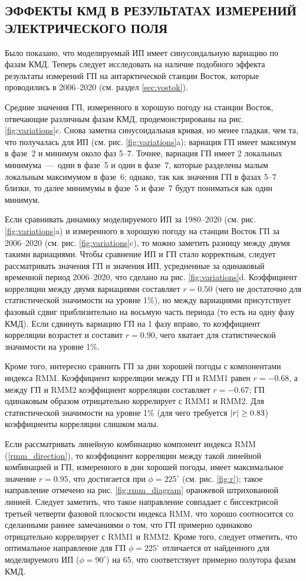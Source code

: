 \subsection{ЭФФЕКТЫ КМД В РЕЗУЛЬТАТАХ ИЗМЕРЕНИЙ ЭЛЕКТРИЧЕСКОГО ПОЛЯ}
\label{sec:mjo_pg}

Было показано, что моделируемый ИП имеет синусоидальную вариацию по фазам КМД. Теперь следует исследовать на наличие подобного эффекта результаты измерений ГП на антарктической станции Восток, которые проводились в 2006--2020 (см. раздел \ref{sec:vostok}).

Средние значения ГП, измеренного в хорошую погоду на станции Восток, отвечающие различным фазам КМД, продемонстрированы на рис. \ref{fig:variations}{c}. Снова заметна синусоидальная кривая, но менее гладкая, чем та, что получалась для ИП (см. рис. \ref{fig:variations}{a}); вариация ГП имеет максимум в фазе~2 и минимум около фаз 5--7. Точнее, вариация ГП имеет 2 локальных минимума~---~один в фазе~5 и один в фазе~7, которые разделены малым локальным максимумом в фазе~6; однако, так как значения ГП в фазах 5--7 близки, то далее минимумы в фазе~5 и фазе~7 будут пониматься как один минимум.

Если сравнивать динамику моделируемого ИП за 1980--2020 (см. рис. \ref{fig:variations}{a}) и измеренного в хорошую погоду на станции Восток ГП за 2006--2020 (см. рис. \ref{fig:variations}{c}), то можно заметить разницу между двумя такими вариациями. Чтобы сравнение ИП и ГП стало корректным, следует рассматривать значения ГП и значения ИП, усредненные за одинаковый временной период 2006--2020, что сделано на рис. \ref{fig:variations}{d}. Коэффициент корреляции между двумя вариациями составляет $r=0.50$ (чего не достаточно для статистической значимости на уровне 1\%), но между вариациями присутствует фазовый сдвиг приблизительно на восьмую часть периода (то есть на одну фазу КМД). Если сдвинуть вариацию ГП на 1 фазу вправо, то коэффициент корреляции возрастет и составит $r=0.90$, чего хватает для статистической значимости на уровне 1\%.

Кроме того, интересно сравнить ГП за дни хорошей погоды с компонентами индекса RMM. Коэффициент корреляции между ГП и RMM1 равен $r=-0.68$, а между ГП и RMM2 коэффициент корреляции составляет $r=-0.67$; ГП одинаковым образом отрицательно коррелирует с RMM1 и RMM2. Для статистической значимости на уровне 1\% (для чего требуется $\abs{r}\ge0.83$) коэффициенты корреляции слишком малы.

Если рассматривать линейную комбинацию компонент индекса RMM (\ref{rmm_direction}), то коэффициент корреляции между такой линейной комбинацией и ГП, измеренного в дни хорошей погоды, имеет максимальное значение $r=0.95$, что достигается при $\phi=225^\circ$ (см. рис. \ref{fig:r}); такое направление отмечено на рис. \ref{fig:rmm_diagram} оранжевой штрихованной линией. Следует заметить, что такое направление совпадает с биссектрисой третьей четверти фазовой плоскости индекса RMM, что хорошо соотносится со сделанными раннее замечаниями о том, что ГП примерно одинаково отрицательно коррелирует с RMM1 и RMM2. Кроме того, следует отметить, что оптимальное направление для ГП $\phi=225^\circ$ отличается от найденного для моделируемого ИП ($\phi=90^\circ$) на 65\textdegree, что соответствует примерно полутора фазам КМД.

